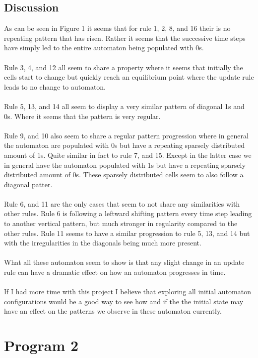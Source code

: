 \documentclass{article}
\begin{document}
\subsection{Discussion}
As can be seen in Figure 1 it seems that for rule 1, 2, 8, and 16 their is no repeating pattern that has risen. Rather it seems that the successive time steps have simply led to the entire automaton being populated with 0s.\\
\\
Rule 3, 4, and 12 all seem to share a property where it seems that initially the cells start to change but quickly reach an equilibrium point where the update rule leads to no change to automaton.\\
\\
Rule 5, 13, and 14 all seem to display a very similar pattern of diagonal 1s and 0s. Where it seems that the pattern is very regular.\\
\\
Rule 9, and 10 also seem to share a regular pattern progression where in general the automaton are populated with 0s but have a repeating sparsely distributed amount of 1s. Quite similar in fact to rule 7, and 15. Except in the latter case we in general have the automaton populated with 1s but have a repeating sparsely distributed amount of 0s. These sparsely distributed cells seem to also follow a diagonal patter.\\
\\
Rule 6, and 11 are the only cases that seem to not share any similarities with other rules. Rule 6 is following a leftward shifting pattern every time step leading to another vertical pattern, but much stronger in regularity compared to the other rules. Rule 11 seems to have a similar progression to rule 5, 13, and 14 but with the irregularities in the diagonals being much more present.\\
\\
What all these automaton seem to show is that any slight change in an update rule can have a dramatic effect on how an automaton progresses in time.\\
\\
If I had more time with this project I believe that exploring all initial automaton configurations would be a good way to see how and if the the initial state may have an effect on the patterns we observe in these automaton currently.
\section{Program 2}
\end{document}
